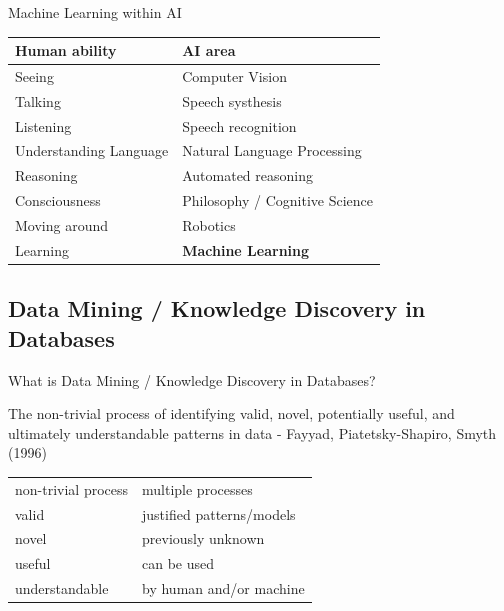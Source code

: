 \documentclass{beamer}
\begin{document}
\begin{frame}{Machine Learning within AI}

\begin{center}
\begin{tabular}{ll}
\hline
\textbf{Human ability} & \textbf{AI area} \\
\hline\hline
Seeing & Computer Vision \\
Talking & Speech systhesis \\
Listening & Speech recognition \\
Understanding Language &  Natural Language Processing \\
Reasoning & Automated reasoning \\
Consciousness & Philosophy / Cognitive Science \\
Moving around & Robotics \\
Learning & \textbf{Machine Learning}\\
\hline
\end{tabular}
\end{center}


\end{frame}


\subsection{Data Mining / Knowledge Discovery in Databases}

\begin{frame}{What is Data Mining / Knowledge Discovery in Databases?}


\begin{block}{}
The non-trivial process of identifying valid, novel, potentially useful, and ultimately understandable patterns in data - Fayyad, Piatetsky-Shapiro, Smyth (1996)
\end{block}

\begin{center}
\begin{tabular}{l|l}
non-trivial process &  multiple processes\\
valid & justified patterns/models\\
novel & previously unknown\\
useful &  can be used\\
understandable & by human and/or machine
\end{tabular}
\end{center}


\end{frame}
\end{document}
